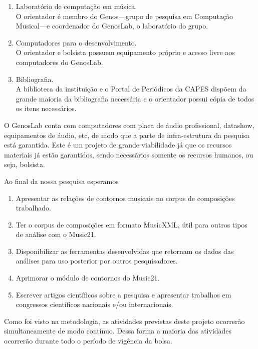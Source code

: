 \documentclass[11pt]{article}
\begin{document}
\begin{enumerate}
\item Laboratório de computação em música. \\
  O orientador é membro do Genos---grupo de pesquisa em Computação
  Musical---e coordenador do GenosLab, o laboratório do grupo.
\item Computadores para o desenvolvimento.\\
  O orientador e bolsista possuem equipamento próprio e acesso livre
  aos computadores do GenosLab.
\item Bibliografia.\\ A biblioteca da instituição e o Portal de
  Periódicos da CAPES dispõem da grande maioria da bibliografia
  necessária e o orientador possui cópia de todos os itens
  necessários.
\end{enumerate}

O GenosLab conta com computadores com placa de áudio profissional,
datashow, equipamentos de áudio, etc, de modo que a parte de
infra-estrutura da pesquisa está garantida. Este é um projeto de
grande viabilidade já que os recursos materiais já estão garantidos,
sendo necessários somente os recursos humanos, ou seja, bolsista.


Ao final da nossa pesquisa esperamos
\begin{enumerate}
\item Apresentar as relações de contornos musicais no corpus de
  composições trabalhado.
\item Ter o corpus de composições em formato MusicXML, útil para
  outros tipos de análise com o Music21.
\item Disponibilizar as ferramentas desenvolvidas que retornam os
  dados das análises para uso posterior por outros pesquisadores.
\item Aprimorar o módulo de contornos do Music21.
\item Escrever artigos científicos sobre a pesquisa e apresentar
  trabalhos em congressos científicos nacionais e/ou internacionais.
\end{enumerate}


Como foi visto na metodologia, as atividades previstas deste projeto
ocorrerão simultaneamente de modo contínuo. Dessa forma a maioria das
atividades ocorrerão durante todo o período de vigência da bolsa.
\end{document}
